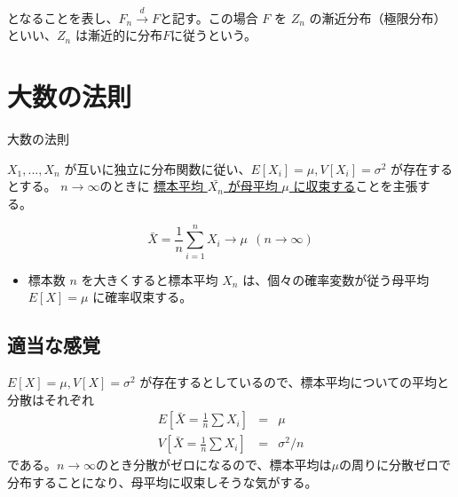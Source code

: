 \documentclass[10pt, a4paper]{ltjsarticle}
\begin{document}
となることを表し、$F_n\xrightarrow{d}F$と記す。この場合 $F$ を $Z_n$ の漸近分布（極限分布）といい、$Z_n$ は漸近的に分布$F$に従うという。


\section{大数の法則}


\begin{itembox}[l]{大数の法則}

  $X_1,...,X_n$ が互いに独立に分布関数に従い、$E[X_i]=\mu, V[X_i]=\sigma^2$ が存在するとする。
  $n\to\infty$のときに \underline{標本平均 $\bar{X_n}$ が母平均 $\mu$ に収束する}ことを主張する。

\begin{equation}
\bar{X} = \frac{1}{n} \sum_{i=1}^n X_i \to \mu ~~ (n\to\infty)
\end{equation}

\end{itembox}

\begin{itemize}
  \item 標本数 $n$ を大きくすると標本平均 $X_n$ は、個々の確率変数が従う母平均 $E[X]=\mu$ に確率収束する。
\end{itemize}


\subsection{適当な感覚}

$E[X]=\mu, V[X]=\sigma^2$ が存在するとしているので、標本平均についての平均と分散はそれぞれ
\begin{eqnarray}
E \left[\bar{X} = \frac{1}{n}\sum X_i \right] &=& \mu\\
V \left[\bar{X} = \frac{1}{n}\sum X_i\right] &=& \sigma^2/n
\end{eqnarray}
である。$n\to\infty$のとき分散がゼロになるので、標本平均は$\mu$の周りに分散ゼロで分布することになり、母平均に収束しそうな気がする。
\end{document}
